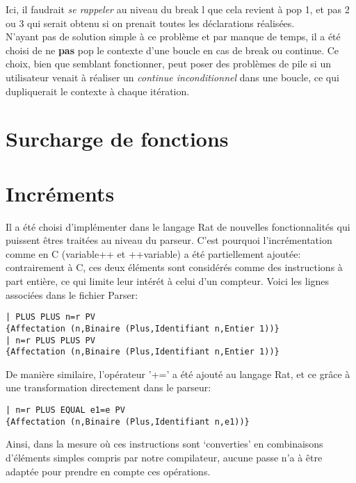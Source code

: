 \documentclass[french]{article}
\begin{document}
Ici, il faudrait \textit{se rappeler} au niveau du break l que cela revient à pop 1, et pas 2 ou 3 qui serait obtenu si on prenait toutes les déclarations réalisées.\\
N'ayant pas de solution simple à ce problème et par manque de temps, il a été choisi de ne \textbf{pas} pop le contexte d'une boucle en cas de break ou continue.
Ce choix, bien que semblant fonctionner, peut poser des problèmes de pile si un utilisateur venait à réaliser un \textit{continue inconditionnel} dans une boucle, 
ce qui dupliquerait le contexte à chaque itération.
\section{Surcharge de fonctions}

\section{Incréments}
Il a été choisi d'implémenter dans le langage Rat de nouvelles fonctionnalités qui puissent êtres traitées au niveau du parseur. C'est pourquoi
l'incrémentation comme en C (variable++ et ++variable) a été partiellement ajoutée: contrairement à C, ces deux éléments sont considérés comme
des instructions à part entière, ce qui limite leur intérét à celui d'un compteur. Voici les lignes associées dans le fichier Parser:
\begin{lstlisting}
| PLUS PLUS n=r PV 
{Affectation (n,Binaire (Plus,Identifiant n,Entier 1))}
| n=r PLUS PLUS PV 
{Affectation (n,Binaire (Plus,Identifiant n,Entier 1))}
\end{lstlisting}
De manière similaire, l'opérateur '+=' a été ajouté au langage Rat, et ce grâce à une transformation directement dans le parseur:
\begin{lstlisting}
| n=r PLUS EQUAL e1=e PV 
{Affectation (n,Binaire (Plus,Identifiant n,e1))}
\end{lstlisting} 
Ainsi, dans la mesure où ces instructions sont `converties' en combinaisons d'éléments simples compris par notre compilateur, aucune passe n'a
à être adaptée pour prendre en compte ces opérations.
\end{document}

